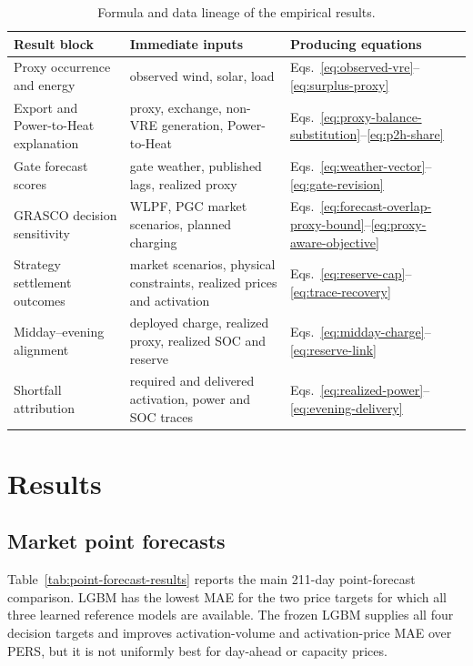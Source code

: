 \documentclass[11pt,a4paper]{article}
\begin{document}
\begin{table}[htbp]
  \centering
  \small
  \caption{Formula and data lineage of the empirical results.}
  \begin{tabular}{p{}p{}p{}}
    \toprule
    Result block & Immediate inputs & Producing equations \\
    \midrule
    Proxy occurrence and energy
      & observed wind, solar, load
      & Eqs.~\eqref{eq:observed-vre}--\eqref{eq:surplus-proxy} \\
    Export and Power-to-Heat explanation
      & proxy, exchange, non-VRE generation, Power-to-Heat
      & Eqs.~\eqref{eq:proxy-balance-substitution}--\eqref{eq:p2h-share} \\
    Gate forecast scores
      & gate weather, published lags, realized proxy
      & Eqs.~\eqref{eq:weather-vector}--\eqref{eq:gate-revision} \\
    GRASCO decision sensitivity
      & WLPF, PGC market scenarios, planned charging
      & Eqs.~\eqref{eq:forecast-overlap-proxy-bound}--\eqref{eq:proxy-aware-objective} \\
    Strategy settlement outcomes
      & market scenarios, physical constraints, realized prices and activation
      & Eqs.~\eqref{eq:reserve-cap}--\eqref{eq:trace-recovery} \\
    Midday--evening alignment
      & deployed charge, realized proxy, realized SOC and reserve
      & Eqs.~\eqref{eq:midday-charge}--\eqref{eq:reserve-link} \\
    Shortfall attribution
      & required and delivered activation, power and SOC traces
      & Eqs.~\eqref{eq:realized-power}--\eqref{eq:evening-delivery} \\
    \bottomrule
  \end{tabular}
  \label{tab:result-lineage}
\end{table}

\section{Results}
\label{sec:results-main}

\subsection{Market point forecasts}

Table~\ref{tab:point-forecast-results} reports the main 211-day point-forecast
comparison.  LGBM has the lowest MAE for the two price targets for which all
three learned reference models are available.  The frozen LGBM supplies all
four decision targets and improves activation-volume and activation-price MAE
over PERS, but it is not uniformly best for day-ahead or capacity prices.
\end{document}
